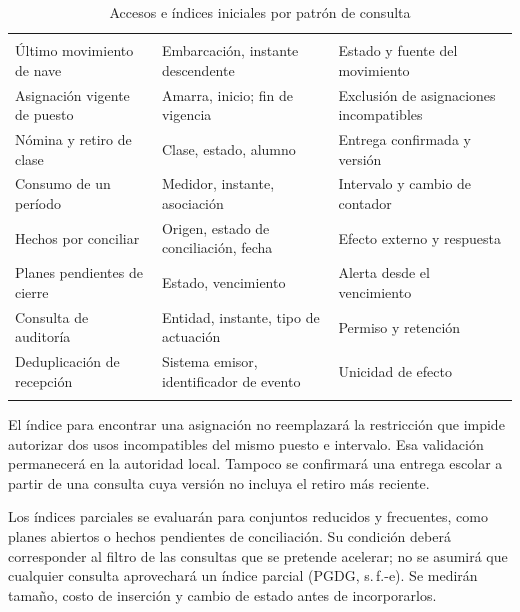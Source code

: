 \begingroup
\setlength{\tabcolsep}{3pt}
\begin{longtable}{@{}L{.29\textwidth}L{.36\textwidth}L{\dimexpr.35\textwidth-12pt\relax}@{}}
\caption{Accesos e índices iniciales por patrón de consulta}\label{tab:sd5_indices_consulta}\\
\hline
{} &  &  \\ \hline
\endfirsthead
\hline
{} &  &  \\ \hline
\endhead
Último movimiento de nave & Embarcación, instante descendente & Estado y fuente del movimiento \\ \addlinespace \hline
Asignación vigente de puesto & Amarra, inicio; fin de vigencia & Exclusión de asignaciones incompatibles \\ \addlinespace \hline
Nómina y retiro de clase & Clase, estado, alumno & Entrega confirmada y versión \\ \addlinespace \hline
Consumo de un período & Medidor, instante, asociación & Intervalo y cambio de contador \\ \addlinespace \hline
Hechos por conciliar & Origen, estado de conciliación, fecha & Efecto externo y respuesta \\ \addlinespace \hline
Planes pendientes de cierre & Estado, vencimiento & Alerta desde el vencimiento \\ \addlinespace \hline
Consulta de auditoría & Entidad, instante, tipo de actuación & Permiso y retención \\ \addlinespace \hline
Deduplicación de recepción & Sistema emisor, identificador de evento & Unicidad de efecto \\ \addlinespace \hline
\end{longtable}
\endgroup

El índice para encontrar una asignación no reemplazará la restricción que impide autorizar dos usos incompatibles del mismo puesto e intervalo. Esa validación permanecerá en la autoridad local. Tampoco se confirmará una entrega escolar a partir de una consulta cuya versión no incluya el retiro más reciente.

Los índices parciales se evaluarán para conjuntos reducidos y frecuentes, como planes abiertos o hechos pendientes de conciliación. Su condición deberá corresponder al filtro de las consultas que se pretende acelerar; no se asumirá que cualquier consulta aprovechará un índice parcial (PGDG, s.\,f.-e). Se medirán tamaño, costo de inserción y cambio de estado antes de incorporarlos.

